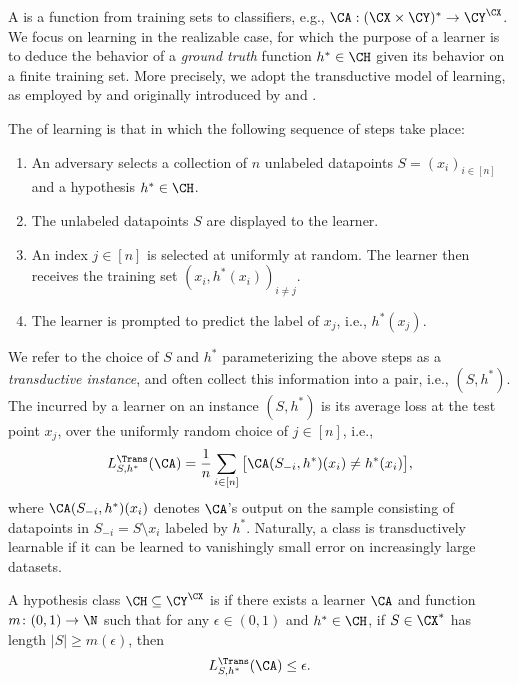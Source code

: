 A  is a function from training sets to classifiers, e.g., $\CA : (\CX \times \CY)^* \to \CY^\CX$. We focus on learning in the realizable case, for which the purpose of a learner is to deduce the behavior of a \emph{ground truth} function $h^* \in \CH$ given its behavior on a finite training set. More precisely, we adopt the transductive model of learning, as employed by \citet{haussler1994predicting} and originally introduced by \citet{vapnik1974theory} and \citet{vapnik1982estimation}. 

\begin{definition}
The  of learning is that in which the following sequence of steps take place: 
\begin{enumerate}
    \item An adversary selects a collection of $n$ unlabeled datapoints $S  = (x_{i})_{i\in [n]}$ and a hypothesis $h^* \in \CH$. 
    \item The unlabeled datapoints $S$ are displayed to the learner. 
    \item An index $j \in [n]$ is selected at uniformly at random. The learner then receives the training set $(x_i, h^*(x_i))_{i \neq j}$. 
    \item The learner is prompted to predict the label of $x_j$, i.e., $h^*(x_j)$.
\end{enumerate}
\end{definition}

We refer to the choice of $S$ and $h^*$ parameterizing the above steps as a \emph{transductive instance}, and often collect this information into a pair, i.e., $(S, h^*)$. The  incurred by a learner on an instance $(S, h^*)$ is its average loss at the test point $x_j$, over the uniformly random choice of $j \in [n]$, i.e.,
\[ L^{\Trans}_{S, h^*}(\CA) = \frac 1n \sum_{i \in [n]} \big[ \CA(S_{-i}, h^*)(x_i) \neq h^*(x_i) \big], \]
where $\CA(S_{-i}, h^*)(x_i)$ denotes $\CA$'s output on the sample consisting of datapoints in $S_{-i} = S \setminus x_i$ labeled by $h^*$. 
Naturally, a class is transductively learnable if it can be learned to vanishingly small error on increasingly large datasets. 

\begin{definition}\label{Definition:trans-learning}
A hypothesis class $\CH \subseteq \CY^\CX$ is  if there exists a learner $\CA$ and function $m \colon (0, 1) \to \N$ such that for any $\epsilon \in (0, 1)$ and $h^* \in \CH$, if $S \in \CX^*$ has length $|S| \geq m(\epsilon)$, then 
\[ L_{S, h^*}^{\Trans}(\CA) \leq \epsilon. \]
\end{definition}

